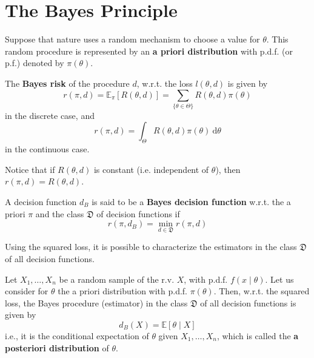 \documentclass[12pt,a4paper]{report}
\begin{document}
\section{The Bayes Principle}

Suppose that nature uses a random mechanism to choose a value for $\theta$. This random procedure is represented by an \textbf{a priori distribution} with p.d.f. (or p.f.) denoted by $\pi(\theta)$. 

\begin{definition}
    The \textbf{Bayes risk} of the procedure $d$, w.r.t. the loss $l(\theta, d)$ is given by 
    \begin{equation*}
        r(\pi, d) = \mathbb{E}_\pi [R(\theta, d)] = \sum_{\{ \theta \in \Theta \}} R(\theta, d) \pi(\theta)
    \end{equation*}
    in the discrete case, and 
    \begin{equation*}
        r(\pi, d) = \int_{\Theta} R(\theta, d) \pi(\theta) ~\mathrm{d}\theta
    \end{equation*}
    in the continuous case.
\end{definition}

Notice that if $R(\theta, d)$ is constant (i.e. independent of $\theta$), then $r(\pi, d) = R(\theta, d)$. 

\begin{definition}
    A decision function $d_B$ is said to be a \textbf{Bayes decision function} w.r.t. the a priori $\pi$ and the class $\mathfrak{D}$ of decision functions if 
    \[
        r(\pi, d_B) = \min_{d \in \mathfrak{D}} r(\pi, d)
    \]
\end{definition}

Using the squared loss, it is possible to characterize the estimators in the class $\mathfrak{D}$ of all decision functions. 

\begin{theorem}\label{thm:sqr_bayes_est}
    Let $X_1, \ldots, X_n$ be a random sample of the r.v. $X$, with p.d.f. $f(x \mid \theta)$. Let us consider for $\theta$ the a priori distribution with p.d.f. $\pi(\theta)$. Then, w.r.t. the squared loss, the Bayes procedure (estimator) in the class $\mathfrak{D}$ of all decision functions is given by 
    \[
        d_B(X) = \mathbb{E} [ \theta \mid X ]
    \]
    i.e., it is the conditional expectation of $\theta$ given $X_1, \ldots, X_n$, which is called the \textbf{a posteriori distribution} of $\theta$.
\end{theorem}
\end{document}
